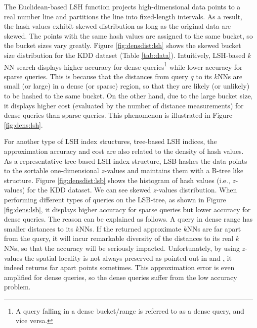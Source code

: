 The Euclidean-based LSH function \cite{datar} projects high-dimensional data points to a real number line and partitions the line into fixed-length intervals. As a result, the hash values exhibit skewed distribution as long as the original data are skewed. The points with the same hash values are assigned to the same bucket, so the bucket sizes vary greatly. Figure \ref{fig:densdist:lsh} shows the skewed bucket size distribution for the KDD dataset (Table \ref{tab:data}). Intuitively, LSH-based $k$NN search displays higher accuracy for dense queries\footnote{A query falling in a dense bucket/range is referred to as a dense query, and vice versa.} while lower accuracy for sparse queries. This is because that the distances from query $q$ to its $k$NNs are small (or large) in a dense (or sparse) region, so that they are likely (or unlikely) to be hashed to the same bucket. On the other hand, due to the large bucket size, it displays higher cost (evaluated by the number of distance measurements) for dense queries than sparse queries. This phenomenon is illustrated in Figure \ref{fig:dens:lsh}. %

For another type of LSH index structures, tree-based LSH indices, the approximation accuracy and cost are also related to the density of hash values. As a representative tree-based LSH index structure, LSB \cite{lsb} hashes the data points to the sortable one-dimensional $z$-values and maintains them with a B-tree like structure. Figure \ref{fig:densdist:lsb} shows the histogram of hash values (i.e., $z$-values) for the KDD dataset. We can see skewed $z$-values distribution. When performing different types of queries on the LSB-tree, as shown in Figure \ref{fig:dens:lsb}, it displays higher accuracy for sparse queries but lower accuracy for dense queries. The reason can be explained as follows. A query in dense range has smaller distances to its $k$NNs. If the returned approximate $k$NNs are far apart from the query, it will incur remarkable diversity of the distances to its real $k$NNs, so that the accuracy will be seriously impacted. Unfortunately, by using $z$-values the spatial locality is not always preserved as pointed out in \cite{zorkderknn} and \cite{Zhang:2012:EPK:2247596.2247602}, it indeed returns far apart points sometimes. This approximation error is even amplified for dense queries, so the dense queries suffer from the low accuracy problem.


